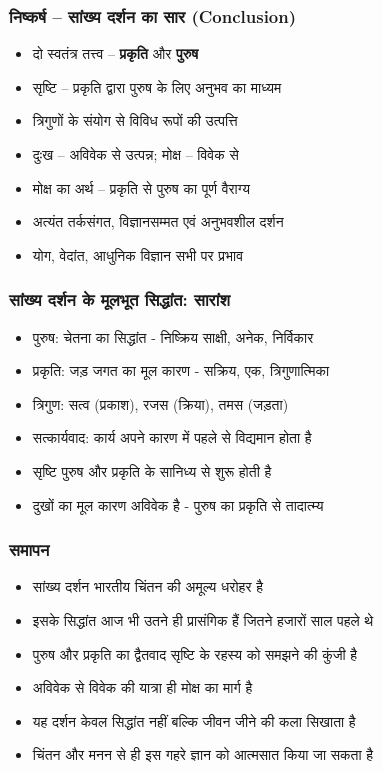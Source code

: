 \begin{frame}[fragile]\frametitle{निष्कर्ष – सांख्य दर्शन का सार (Conclusion)}
\begin{itemize}
  \item दो स्वतंत्र तत्त्व – \textbf{प्रकृति} और \textbf{पुरुष}
  \item सृष्टि – प्रकृति द्वारा पुरुष के लिए अनुभव का माध्यम
  \item त्रिगुणों के संयोग से विविध रूपों की उत्पत्ति
  \item दुःख – अविवेक से उत्पन्न; मोक्ष – विवेक से
  \item मोक्ष का अर्थ – प्रकृति से पुरुष का पूर्ण वैराग्य
  \item अत्यंत तर्कसंगत, विज्ञानसम्मत एवं अनुभवशील दर्शन
  \item योग, वेदांत, आधुनिक विज्ञान सभी पर प्रभाव
\end{itemize}
\end{frame}

\begin{frame}[fragile]\frametitle{सांख्य दर्शन के मूलभूत सिद्धांत: सारांश}
      \begin{itemize}
	\item पुरुष: चेतना का सिद्धांत - निष्क्रिय साक्षी, अनेक, निर्विकार
	\item प्रकृति: जड़ जगत का मूल कारण - सक्रिय, एक, त्रिगुणात्मिका
	\item त्रिगुण: सत्व (प्रकाश), रजस (क्रिया), तमस (जड़ता)
	\item सत्कार्यवाद: कार्य अपने कारण में पहले से विद्यमान होता है
	\item सृष्टि पुरुष और प्रकृति के सानिध्य से शुरू होती है
	\item दुखों का मूल कारण अविवेक है - पुरुष का प्रकृति से तादात्म्य
	  \end{itemize}
\end{frame}


\begin{frame}[fragile]\frametitle{समापन}
      \begin{itemize}
	\item सांख्य दर्शन भारतीय चिंतन की अमूल्य धरोहर है
	\item इसके सिद्धांत आज भी उतने ही प्रासंगिक हैं जितने हजारों साल पहले थे
	\item पुरुष और प्रकृति का द्वैतवाद सृष्टि के रहस्य को समझने की कुंजी है
	\item अविवेक से विवेक की यात्रा ही मोक्ष का मार्ग है
	\item यह दर्शन केवल सिद्धांत नहीं बल्कि जीवन जीने की कला सिखाता है
	\item चिंतन और मनन से ही इस गहरे ज्ञान को आत्मसात किया जा सकता है
	  \end{itemize}
\end{frame}

